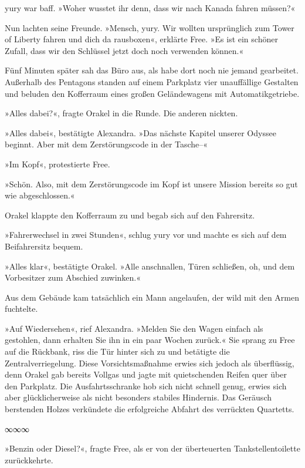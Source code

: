 yury war baff. »Woher wusstet ihr denn, dass wir nach Kanada fahren müssen?«

Nun lachten seine Freunde. »Mensch, yury. Wir wollten ursprünglich zum Tower of Liberty fahren und dich da rausboxen«, erklärte Free. »Es ist ein schöner Zufall, dass wir den Schlüssel jetzt doch noch verwenden können.«

Fünf Minuten später sah das Büro aus, als habe dort noch nie jemand gearbeitet. Außerhalb des Pentagons standen auf einem Parkplatz vier unauffällige Gestalten und beluden den Kofferraum eines großen Geländewagens mit Automatikgetriebe.

»Alles dabei?«, fragte Orakel in die Runde. Die anderen nickten.

»Alles dabei«, bestätigte Alexandra. »Das nächste Kapitel unserer Odyssee beginnt. Aber mit dem Zerstörungscode in der Tasche–«

»Im Kopf«, protestierte Free.

»Schön. Also, mit dem Zerstörungscode im Kopf ist unsere Mission bereits so gut wie abgeschlossen.«

Orakel klappte den Kofferraum zu und begab sich auf den Fahrersitz.

»Fahrerwechsel in zwei Stunden«, schlug yury vor und machte es sich auf dem Beifahrersitz bequem.

»Alles klar«, bestätigte Orakel. »Alle anschnallen, Türen schließen, oh, und dem Vorbesitzer zum Abschied zuwinken.«

Aus dem Gebäude kam tatsächlich ein Mann angelaufen, der wild mit den Armen fuchtelte.

»Auf Wiedersehen«, rief Alexandra. »Melden Sie den Wagen einfach als gestohlen, dann erhalten Sie ihn in ein paar Wochen zurück.« Sie sprang zu Free auf die Rückbank, riss die Tür hinter sich zu und betätigte die Zentralverriegelung. Diese Vorsichtsmaßnahme erwies sich jedoch als überflüssig, denn Orakel gab bereits Vollgas und jagte mit quietschenden Reifen quer über den Parkplatz. Die Ausfahrtsschranke hob sich nicht schnell genug, erwies sich aber glücklicherweise als nicht besonders stabiles Hindernis. Das Geräusch berstenden Holzes verkündete die erfolgreiche Abfahrt des verrückten Quartetts.

\begin{center}
∞∞∞
\end{center}

»Benzin oder Diesel?«, fragte Free, als er von der überteuerten Tankstellentoilette zurückkehrte.

